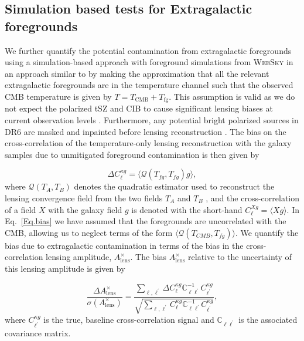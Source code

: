 \documentclass[twocolumn]{aastex631}
\newcommand{\Ax}{A^{\times}_{\mathrm{lens}}}
\begin{document}
{\subsection{Simulation based tests for Extragalactic foregrounds}\label{sec. websky}
We further quantify the potential contamination from extragalactic foregrounds using a simulation-based approach with foreground simulations from \textsc{WebSky} \citep{Stein_2020} in an approach similar to \cite{maccrann2023atacama} by making the approximation that all the relevant extragalactic foregrounds are in the temperature channel such that the observed CMB temperature is given by $T=T_\mathrm{CMB}+T_\mathrm{fg}$. This assumption is valid as we do not expect the polarized tSZ and CIB to cause significant lensing biases at current observation levels \citep{qu2024impactmitigationpolarized}. Furthermore, any potential bright polarized sources in DR6 are masked and inpainted before lensing reconstruction \citep{qu2023atacama}.  The bias on the cross-correlation of the temperature-only lensing reconstruction with the galaxy samples due to unmitigated foreground contamination is then given by

\begin{equation} \label{Eq.bias}
    \Delta{C_\ell^{\kappa{g}}}=\langle\mathcal{Q}(T_{fg},T_{fg})g\rangle,
\end{equation}
where $\mathcal{Q}(T_A,T_B)$ denotes the quadratic estimator used to reconstruct the lensing convergence field from the two fields $T_A$ and $T_B$ , and the cross-correlation of a field $X$ with the galaxy field $g$  is denoted with the short-hand $C^{Xg}_\ell=\langle{X}g\rangle$. In Eq.~\ref{Eq.bias} we have assumed that the foregrounds are uncorrelated with the CMB, allowing us to neglect terms of the form $\langle\mathcal{Q}(T_{CMB},T_{fg})\rangle$.
We quantify the bias due to extragalactic contamination in terms of the bias in the cross-correlation lensing amplitude, $\Ax$. The bias $\Ax$ relative to the uncertainty  of this lensing amplitude is given by

\begin{equation}
    \frac{\Delta{\Ax}}{\sigma({\Ax})}=\frac{\sum_{\ell,\ell^\prime}\Delta{C^{\kappa{g}}_\ell}\mathbb{C}^{-1}_{\ell\ell^\prime}C^{\kappa{g}}_{\ell^\prime}}{{\sqrt{\sum_{\ell,\ell^\prime}{C^{\kappa{g}}_\ell}\mathbb{C}^{-1}_{\ell\ell^\prime}C^{\kappa{g}}_{\ell^\prime}}}},
\end{equation}
where  $C^{\kappa{g}}_{\ell^\prime}$ is the true, baseline cross-correlation signal and $\mathbb{C}_{\ell\ell^\prime}$ is the associated covariance matrix.

}
\end{document}
